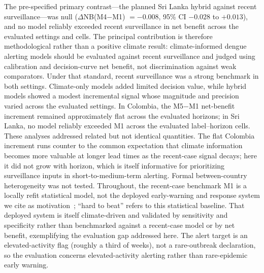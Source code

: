 \documentclass[11pt,a4paper]{article}
\begin{document}
The pre-specified primary contrast---the planned Sri Lanka hybrid against recent surveillance---was null ($\Delta$NB(M4$-$M1) $=-0.008$, 95\% CI $-0.028$ to $+0.013$), and no model reliably exceeded recent surveillance in net benefit across the evaluated settings and cells. The principal contribution is therefore methodological rather than a positive climate result: climate-informed dengue alerting models should be evaluated against recent surveillance and judged using calibration and decision-curve net benefit, not discrimination against weak comparators. Under that standard, recent surveillance was a strong benchmark in both settings. Climate-only models added limited decision value, while hybrid models showed a modest incremental signal whose magnitude and precision varied across the evaluated settings. In Colombia, the M5$-$M1 net-benefit increment remained approximately flat across the evaluated horizons; in Sri Lanka, no model reliably exceeded M1 across the evaluated label--horizon cells. These analyses addressed related but not identical quantities. The flat Colombia increment runs counter to the common expectation that climate information becomes more valuable at longer lead times as the recent-case signal decays; here it did not grow with horizon, which is itself informative for prioritizing surveillance inputs in short-to-medium-term alerting. Formal between-country heterogeneity was not tested. Throughout, the recent-case benchmark M1 is a locally refit statistical model, not the deployed early-warning and response system we cite as motivation~\cite{EWARScsd}; ``hard to beat'' refers to this statistical baseline. That deployed system is itself climate-driven and validated by sensitivity and specificity rather than benchmarked against a recent-case model or by net benefit, exemplifying the evaluation gap addressed here. The alert target is an elevated-activity flag (roughly a third of weeks), not a rare-outbreak declaration, so the evaluation concerns elevated-activity alerting rather than rare-epidemic early warning.
\end{document}
